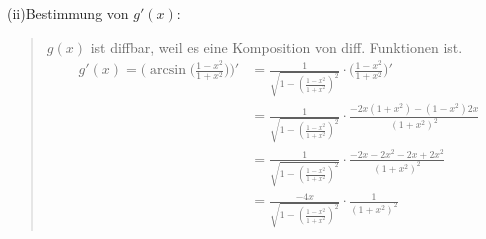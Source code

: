 (ii)\;\;Bestimmung von $ g'(x) $:\\
\begin{quote}
	$ g(x) $ ist diffbar, weil es eine Komposition von diff. Funktionen ist.\\
	\begin{align*}
	g'(x)=\bigg(\arcsin\bigg(\frac{1-x^2}{1+x^2}\bigg)\bigg)'&=\frac{1}{\sqrt{1-(\frac{1-x^2}{1+x^2})^2}}\cdot\bigg(\frac{1-x^2}{1+x^2}\bigg)'\\
	&=\frac{1}{\sqrt{1-(\frac{1-x^2}{1+x^2})^2}}\cdot \frac{-2x(1+x^2)-(1-x^2)2x}{(1+x^2)^2}\\
	&=\frac{1}{\sqrt{1-(\frac{1-x^2}{1+x^2})^2}}\cdot\frac{-2x-2x^2-2x+2x^2}{(1+x^2)^2}\\
	&=\frac{-4x}{\sqrt{1-(\frac{1-x^2}{1+x^2})^2}}\cdot \frac{1}{(1+x^2)^2}
	\end{align*}
\end{quote}
